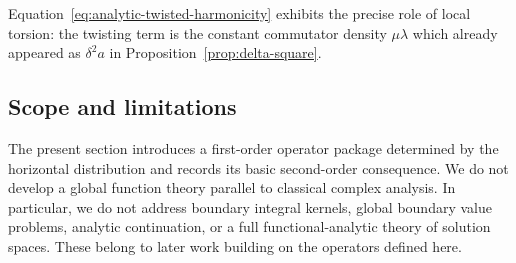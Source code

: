 Equation~\eqref{eq:analytic-twisted-harmonicity} exhibits the precise role of local torsion: the twisting term is the constant commutator density $\mu\lambda$ which already appeared as $\delta^2a$ in Proposition~\ref{prop:delta-square}.

\subsection{Scope and limitations}\label{subsec:analytic-scope}

The present section introduces a first-order operator package determined by the horizontal distribution and records its basic second-order consequence. We do not develop a global function theory parallel to classical complex analysis. In particular, we do not address boundary integral kernels, global boundary value problems, analytic continuation, or a full functional-analytic theory of solution spaces. These belong to later work building on the operators defined here.

